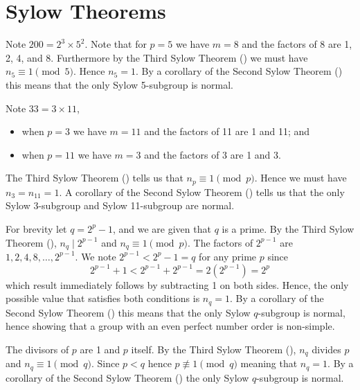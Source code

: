 \section{Sylow Theorems}
\begin{questions}
    \item Note $200 = 2^3 \times 5^2$. Note that for $p = 5$ we have $m = 8$ and the factors of 8 are 1, 2, 4, and 8. Furthermore by the Third Sylow Theorem () we must have $n_5 \equiv 1 \pmod 5$. Hence $n_5 = 1$. By a corollary of the Second Sylow Theorem () this means that the only Sylow 5-subgroup is normal.

    \item Note $33 = 3 \times 11$,
    \begin{itemize}
        \item when $p = 3$ we have $m = 11$ and the factors of 11 are 1 and 11; and
        \item when $p = 11$ we have $m = 3$ and the factors of 3 are 1 and 3.
    \end{itemize}
    The Third Sylow Theorem () tells us that $n_p \equiv 1 \pmod p$. Hence we must have $n_3 = n_{11} = 1$. A corollary of the Second Sylow Theorem () tells us that the only Sylow 3-subgroup and Sylow 11-subgroup are normal.

    \item For brevity let $q = 2^p - 1$, and we are given that $q$ is a prime. By the Third Sylow Theorem (), $n_q \mid 2^{p-1}$ and $n_q \equiv 1 \pmod p$. The factors of $2^{p-1}$ are $1, 2, 4, 8, \dots, 2^{p-1}$. We note $2^{p-1} < 2^p - 1 = q$ for any prime $p$ since
    \[
        2^{p-1} + 1 < 2^{p-1} + 2^{p-1} = 2(2^{p-1}) = 2^p
    \]
    which result immediately follows by subtracting 1 on both sides. Hence, the only possible value that satisfies both conditions is $n_q = 1$. By a corollary of the Second Sylow Theorem () this means that the only Sylow $q$-subgroup is normal, hence showing that a group with an even perfect number order is non-simple.

    \item \begin{partquestions}{\roman*}
        \item The divisors of $p$ are 1 and $p$ itself. By the Third Sylow Theorem (), $n_q$ divides $p$ and $n_q \equiv 1 \pmod q$. Since $p < q$ hence $p \not\equiv 1 \pmod q$ meaning that $n_q = 1$. By a corollary of the Second Sylow Theorem () the only Sylow $q$-subgroup is normal.


\end{partquestions}
\end{questions}
